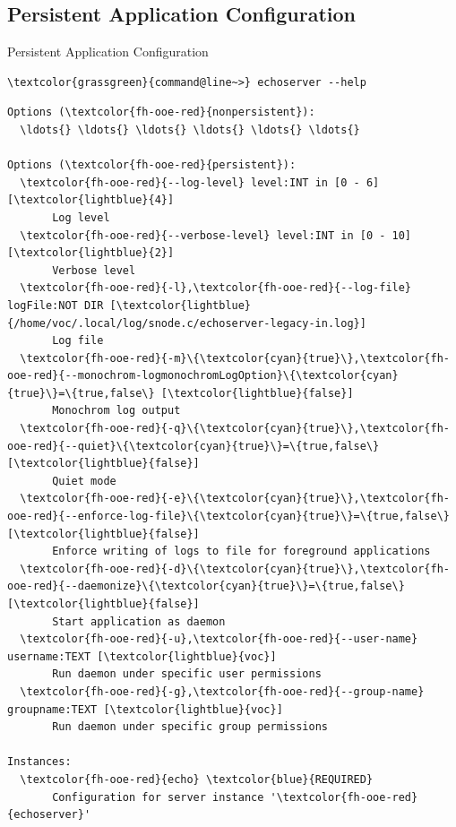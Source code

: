 \subsection{Persistent Application Configuration}

\begin{frame}[fragile]{Persistent Application Configuration}
\begin{scriptsize}
\begin{Verbatim}[commandchars=\\\{\}]
\textcolor{grassgreen}{command@line~>} echoserver --help
\end{Verbatim}
\begin{Verbatim}[commandchars=\\\{\},frame=leftline,rulecolor=\color{fh-ooe-red}]
Options (\textcolor{fh-ooe-red}{nonpersistent}):
  \ldots{} \ldots{} \ldots{} \ldots{} \ldots{} \ldots{}

Options (\textcolor{fh-ooe-red}{persistent}):
  \textcolor{fh-ooe-red}{--log-level} level:INT in [0 - 6] [\textcolor{lightblue}{4}]
       Log level
  \textcolor{fh-ooe-red}{--verbose-level} level:INT in [0 - 10] [\textcolor{lightblue}{2}]
       Verbose level
  \textcolor{fh-ooe-red}{-l},\textcolor{fh-ooe-red}{--log-file} logFile:NOT DIR [\textcolor{lightblue}{/home/voc/.local/log/snode.c/echoserver-legacy-in.log}]
       Log file
  \textcolor{fh-ooe-red}{-m}\{\textcolor{cyan}{true}\},\textcolor{fh-ooe-red}{--monochrom-logmonochromLogOption}\{\textcolor{cyan}{true}\}=\{true,false\} [\textcolor{lightblue}{false}]
       Monochrom log output
  \textcolor{fh-ooe-red}{-q}\{\textcolor{cyan}{true}\},\textcolor{fh-ooe-red}{--quiet}\{\textcolor{cyan}{true}\}=\{true,false\} [\textcolor{lightblue}{false}]
       Quiet mode
  \textcolor{fh-ooe-red}{-e}\{\textcolor{cyan}{true}\},\textcolor{fh-ooe-red}{--enforce-log-file}\{\textcolor{cyan}{true}\}=\{true,false\} [\textcolor{lightblue}{false}]
       Enforce writing of logs to file for foreground applications
  \textcolor{fh-ooe-red}{-d}\{\textcolor{cyan}{true}\},\textcolor{fh-ooe-red}{--daemonize}\{\textcolor{cyan}{true}\}=\{true,false\} [\textcolor{lightblue}{false}]
       Start application as daemon
  \textcolor{fh-ooe-red}{-u},\textcolor{fh-ooe-red}{--user-name} username:TEXT [\textcolor{lightblue}{voc}]
       Run daemon under specific user permissions
  \textcolor{fh-ooe-red}{-g},\textcolor{fh-ooe-red}{--group-name} groupname:TEXT [\textcolor{lightblue}{voc}]
       Run daemon under specific group permissions

Instances:
  \textcolor{fh-ooe-red}{echo} \textcolor{blue}{REQUIRED}
       Configuration for server instance '\textcolor{fh-ooe-red}{echoserver}'
\end{Verbatim}
\end{scriptsize}
\end{frame}
